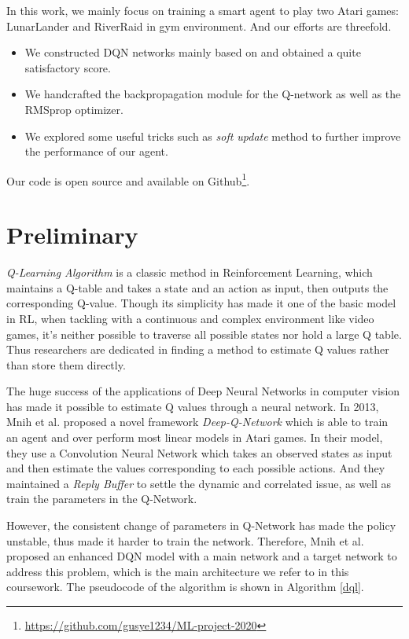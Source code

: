 \documentclass[12pt]{article}
\begin{document}
In this work, we mainly focus on training a smart agent to play two Atari games: LunarLander and RiverRaid in gym environment. And our efforts are threefold.
\begin{itemize}
    \item We constructed DQN networks mainly based on \cite{DBLP:journals/nature/MnihKSRVBGRFOPB15} and obtained a quite satisfactory score.
    \item We handcrafted the backpropagation module for the Q-network as well as the RMSprop optimizer.
    \item We explored some useful tricks such as \emph{soft update} method to further improve the performance of our agent.
\end{itemize}

Our code is open source and available on Github\footnote{ \url{https://github.com/gusye1234/ML-project-2020}}.

\section{Preliminary}
\emph{Q-Learning Algorithm} \cite{watkins92a} is a classic method in Reinforcement Learning, which maintains a Q-table and takes a state and an action as input, then outputs the corresponding Q-value. Though its simplicity has made it one of the basic model in RL, when tackling with a continuous and complex environment like video games, it's neither possible to traverse all possible states nor hold a large Q table. Thus researchers are dedicated in finding a method to estimate Q values rather than store them directly.

The huge success of the applications of Deep Neural Networks in computer vision \cite{krizhevsky2012imagenet} has made it possible to estimate Q values through a neural network. In 2013, Mnih et al. \cite{DBLP:journals/corr/MnihKSGAWR13} proposed a novel framework \emph{Deep-Q-Network} which is able to train an agent and over perform most linear models in Atari games. In their model, they use a Convolution Neural Network which takes an observed states as input and then estimate the values corresponding to each possible actions. And they maintained a \emph{Reply Buffer} to settle the dynamic and correlated issue, as well as train the parameters in the Q-Network.

However, the consistent change of parameters in Q-Network has made the policy unstable, thus made it harder to train the network. Therefore, Mnih et al. \cite{DBLP:journals/nature/MnihKSRVBGRFOPB15} proposed an enhanced DQN model with a main network and a target network to address this problem, which is the main architecture we refer to in this coursework. The pseudocode of the algorithm is shown in Algorithm \ref{dql}.
\end{document}
